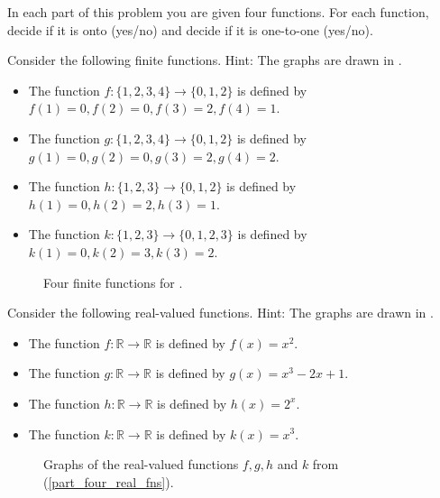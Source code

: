\begin{act}
\label{act_four_functions}
    In each part of this problem you are given four functions. For each function, decide if it is onto (yes/no) and decide if it is one-to-one (yes/no).    
        \begin{apart}
            \item Consider the following finite functions. Hint: The graphs are drawn in .
                \begin{itemize}
                    \item The function $f:\{1,2,3,4\} \to \{0,1,2\}$ is defined by $f(1) = 0, f(2) =0, f(3) = 2, f(4) = 1.$ 
                    \item The function $g:\{1,2,3,4\} \to \{0,1,2\}$ is defined by $g(1) = 0, g(2) =0, g(3) = 2, g(4) = 2.$ 
                    \item The function $h:\{1,2,3\} \to \{0,1,2\}$ is defined by $h(1) = 0, h(2) =2, h(3) = 1.$ 
                    \item The function $k:\{1,2,3\} \to \{0,1,2,3\}$ is defined by $k(1) = 0, k(2) =3, k(3) = 2.$ 
            \end{itemize}

            \begin{figure}[hbtp]
                \centering
                
                \caption{Four finite functions for .}
                \label{fig_finite_fn_act}
            \end{figure}
                       
            \item \label{part_four_real_fns} 
                Consider the following real-valued functions.  Hint: The graphs are drawn in . 
                    \begin{itemize}
                        \item The function $f: \mathbb{R} \to \mathbb{R}$ is defined by $f(x) = x^2$. 
                        \item The function $g: \mathbb{R} \to \mathbb{R}$ is defined by $g(x) = x^3-2x+1$.
                        \item The function $h: \mathbb{R} \to \mathbb{R}$ is defined by $h(x) = 2^x.$ 
                        \item The function $k: \mathbb{R} \to \mathbb{R}$ is defined by $k(x) = x^3$. 
                    \end{itemize}            
                \begin{figure}[hbtp]
                    \centering
                    
                    \caption{Graphs of the real-valued functions $f, g, h$ and $k$ from  (\ref{part_four_real_fns}).}
                    \label{fig_four_real_fns}
                \end{figure}


\end{apart}
\end{act}
